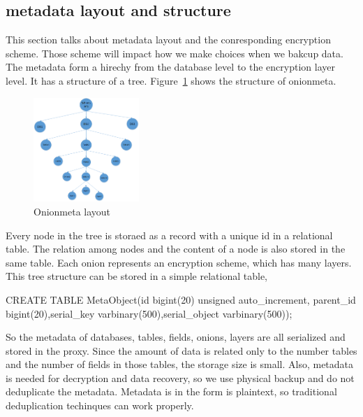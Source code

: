 \subsection{metadata layout and structure}

This section talks about metadata layout and the conresponding encryption scheme. Those scheme will impact how we make choices when we bakcup data. The metadata form a hirechy from the database level to the encryption layer level. It has a structure of a tree. Figure~\ref{fig:stack2} shows the structure of onionmeta.


\begin{figure}[tb]
\centering
\includegraphics[width=4cm]{images/layers.png}
\caption{Onionmeta layout}
\label{fig:stack2}
\end{figure}

Every node in the tree is storaed as a record with a unique id in a relational table. The relation among nodes and the content of a node is also stored in the same table. Each onion represents an encryption scheme, which has many layers. This tree structure can be stored in a simple relational table, 

CREATE TABLE MetaObject(id bigint(20) unsigned auto\_increment, parent\_id bigint(20),serial\_key varbinary(500),serial\_object varbinary(500));  


So the metadata of databases, tables, fields, onions, layers are all serialized and stored in the proxy. Since the amount of data is related only to the number tables and the number of fields in those tables, the storage size is small. Also, metadata is needed for decryption and data recovery, so we use physical backup and do not deduplicate the metadata. Metadata is in the form is plaintext, so traditional deduplication techinques can work properly.

